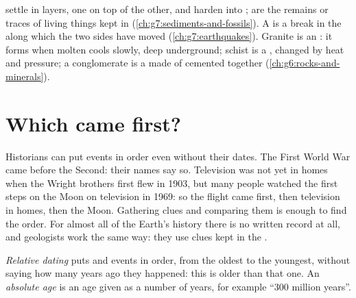 \begin{recall}
 settle in layers, one on top of the other, and harden into
;  are the remains or traces of living things
kept in  (\cref{ch:g7:sediments-and-fossils}). A \emph{} is a
break in the  along which the two sides have moved
(\cref{ch:g7:earthquakes}). Granite is an \emph{}: it forms
when molten  cools slowly, deep underground; schist is a
\emph{}, changed by heat and pressure; a conglomerate is
a  made of  cemented together
(\cref{ch:g6:rocks-and-minerals}).
\end{recall}

\section{Which came first?}

Historians can put events in order even without their dates. The First
World War came before the Second: their names say so. Television was not
yet in homes when the Wright brothers first flew in 1903, but many
people watched the first steps on the Moon on television in 1969: so the
flight came first, then television in homes, then the Moon. Gathering
clues and comparing them is enough to find the order. For almost all of
the Earth's history there is no written record at all, and geologists
work the same way: they use clues kept in the .

\begin{definition}\label{def:g7:geological-time:relative-dating}
\emph{Relative dating} puts  and events in
order, from the oldest to the youngest, without saying how many years
ago they happened: this  is older than that one. An \emph{absolute
age} is an age given as a number of years, for
example ``\num{300} million years''.
\end{definition}

